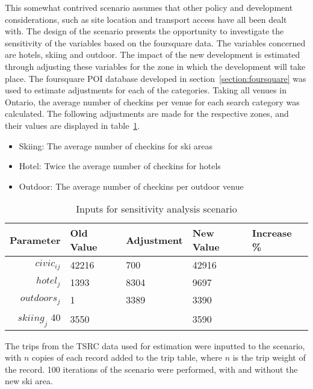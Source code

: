 This somewhat contrived scenario assumes that other policy and development considerations, such as site location and transport access have all been dealt with. The design of the scenario presents the opportunity to investigate the sensitivity of the  variables based on the foursquare data. The variables concerned are hotels, skiing and outdoor. The impact of the new development is estimated through adjusting these variables for the zone in which the development will take place. The foursquare POI database developed in section~\ref{section:foursquare} was used to estimate adjustments for each of the categories. Taking all venues in Ontario, the average number of checkins per venue for each search category was calculated. The following adjustments are made for the respective zones, and their values are displayed in table~\ref{table:scenario-inputs}.

\begin{itemize}
\item Skiing: The average number of checkins for ski areas
\item Hotel: Twice the average number of checkins for hotels
\item Outdoor: The average number of checkins per outdoor venue
\end{itemize}


\begin{table}[H]
\centering
\caption{Inputs for sensitivity analysis scenario}
\label{table:scenario-inputs}
\begin{tabular}{@{}rllll@{}}
  \toprule
 Parameter & Old Value & Adjustment & New Value & Increase \% \\ \midrule
  $civic_{ij}$ & 42216 & 700 & 42916 & \\ 
  $hotel_j$ & 1393  & 8304 & 9697 & \\ 
  $outdoors_j$  & 1 & 3389 & 3390 & \\ 
  $skiing_j$ 40  & 3550 &  & 3590 &\\ 
   \bottomrule
\end{tabular}
\end{table}

The trips from the TSRC data used for estimation were inputted to the scenario, with $n$ copies of each record added to the trip table, where $n$ is the trip weight of the record. 100 iterations of the scenario were performed, with and without the new ski area.




